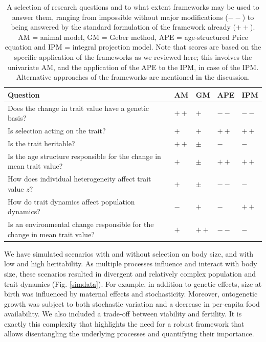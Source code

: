 \begin{table}[ht] 
\caption{A selection of research questions and to what extent frameworks may be used to answer them, ranging from impossible without major modifications ($--$) to being answered by the standard formulation of the framework already ($++$). AM = animal model, GM = Geber method, APE = age-structured Price equation and IPM = integral projection model. Note that scores are based on the specific application of the frameworks as we reviewed here; this involves the univariate AM, and the application of the APE to the IPM, in case of the IPM. Alternative approaches of the frameworks are mentioned in the discussion.} 
\label{table:questions}
\begin{center}
\begin{tabular}{p{9cm}|p{1cm} p{1cm} p{1cm} p{1cm}}
\hline
Question & AM & GM & APE & IPM\\
\hline
Does the change in trait value have a genetic basis? & $++$ & $+$ & $--$ & $--$ \\

Is selection acting on the trait? & $+$ & $+$ & $++$ & $++$ \\

Is the trait heritable? & $++$ & $\pm$ & $-$ & $-$ \\

Is the age structure responsible for the change in mean trait value? & $+$ & $\pm$ & $++$ & $++$ \\

How does individual heterogeneity affect trait value $z$? & $+$ & $\pm$ & $--$ & $-$ \\

How do trait dynamics affect population dynamics? & $-$ & $+$ & $-$ & $++$ \\

Is an environmental change responsible for the change in mean trait value? & $+$ & $++$ & $--$ & $-$\\

\end{tabular}
\end{center}
\end{table}

We have simulated scenarios with and without selection on body size, and with low and high heritability. As multiple processes influence and interact with body size, these scenarios resulted in divergent and relatively complex population and trait dynamics (Fig. \ref{simdata}). For example, in addition to genetic effects, size at birth was influenced by maternal effects and stochasticity. Moreover, ontogenetic growth was subject to both stochastic variation and a decrease in per-capita food availability. We also included a trade-off between viability and fertility. It is exactly this complexity that highlights the need for a robust framework that allows disentangling the underlying processes and quantifying their importance.

